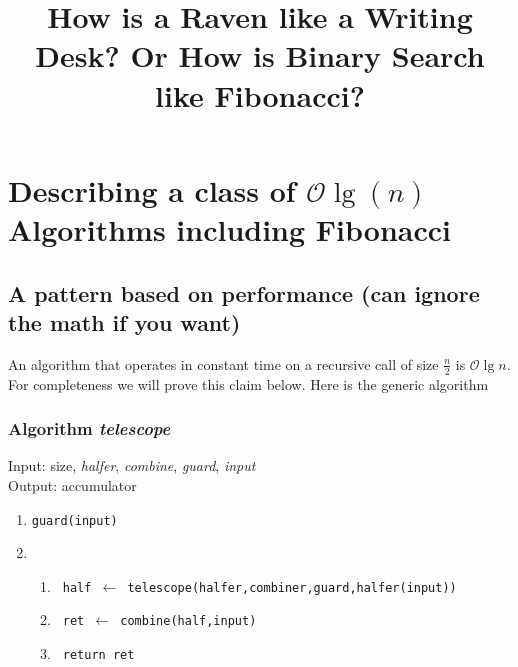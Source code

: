 \documentclass[12pt]{article}
\begin{document}
\setlength{\fboxrule}{.5mm}\setlength{\fboxsep}{1.2mm}
\newlength{\boxlength}\setlength{\boxlength}{\textwidth}
\addtolength{\boxlength}{-4mm}
\begin{center}\end{center}
\title{How is a Raven like a Writing Desk? Or How is Binary Search like Fibonacci?}
\section{Describing a class of $\mathcal{O}\lg(n)$ Algorithms including Fibonacci}
\subsection{A pattern based on performance (can ignore the math if you want)}

An algorithm that operates in constant time on a recursive call of size $\frac{n}{2}$ is $\mathcal{O}\lg{n}$. For completeness we will prove this claim below. Here is the generic algorithm

\subsubsection{Algorithm \textit{telescope}} 
Input: size, \textit{halfer}, \textit{combine},  \textit{guard}, \textit{input} \\
Output: accumulator
\begin{enumerate}
\item \texttt{guard(input)}
\item 
  \begin{enumerate}
    \item \texttt{ half $ \leftarrow$ telescope(halfer,combiner,guard,halfer(input))}
    \item \texttt{ ret $ \leftarrow$ combine(half,input)}
    \item \texttt{ return ret}
  \end{enumerate}
\end{enumerate} 
\end{document}
